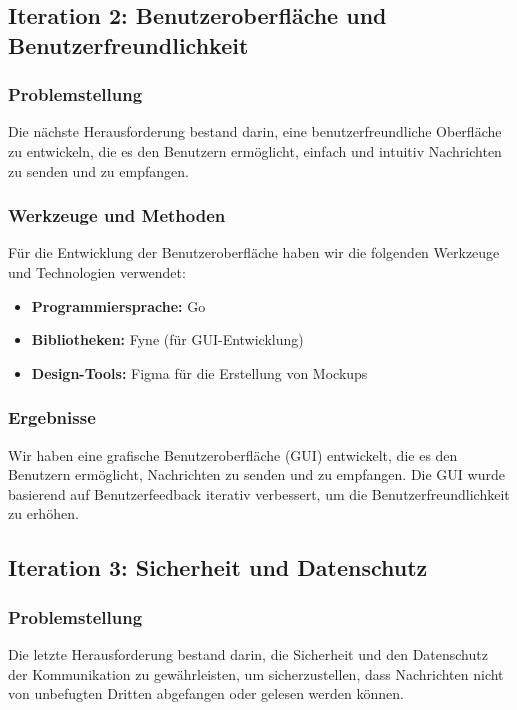 \subsection{Iteration 2: Benutzeroberfläche und Benutzerfreundlichkeit}

\subsubsection{Problemstellung}
Die nächste Herausforderung bestand darin, eine benutzerfreundliche Oberfläche zu entwickeln, die es den Benutzern ermöglicht, einfach und intuitiv Nachrichten zu senden und zu empfangen.

\subsubsection{Werkzeuge und Methoden}
Für die Entwicklung der Benutzeroberfläche haben wir die folgenden Werkzeuge und Technologien verwendet:
\begin{itemize}
    \item \textbf{Programmiersprache:} Go
    \item \textbf{Bibliotheken:} Fyne (für GUI-Entwicklung)
    \item \textbf{Design-Tools:} Figma für die Erstellung von Mockups
\end{itemize}

\subsubsection{Ergebnisse}
Wir haben eine grafische Benutzeroberfläche (GUI) entwickelt, die es den Benutzern ermöglicht, Nachrichten zu senden und zu empfangen. Die GUI wurde basierend auf Benutzerfeedback iterativ verbessert, um die Benutzerfreundlichkeit zu erhöhen.

\subsection{Iteration 3: Sicherheit und Datenschutz}

\subsubsection{Problemstellung}
Die letzte Herausforderung bestand darin, die Sicherheit und den Datenschutz der Kommunikation zu gewährleisten, um sicherzustellen, dass Nachrichten nicht von unbefugten Dritten abgefangen oder gelesen werden können.

